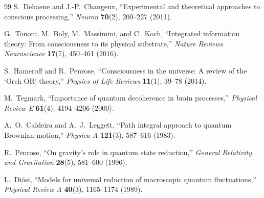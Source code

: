 \documentclass[11pt,a4paper]{article}
\begin{document}
\begin{thebibliography}{99}
S.~Dehaene and J.-P.~Changeux, ``Experimental and theoretical approaches to conscious processing,'' \emph{Neuron} \textbf{70}(2), 200--227 (2011).

G.~Tononi, M.~Boly, M.~Massimini, and C.~Koch, ``Integrated information theory: From consciousness to its physical substrate,'' \emph{Nature Reviews Neuroscience} \textbf{17}(7), 450--461 (2016).

S.~Hameroff and R.~Penrose, ``Consciousness in the universe: A review of the `Orch OR' theory,'' \emph{Physics of Life Reviews} \textbf{11}(1), 39--78 (2014).

M.~Tegmark, ``Importance of quantum decoherence in brain processes,'' \emph{Physical Review E} \textbf{61}(4), 4194--4206 (2000).

A.~O.~Caldeira and A.~J.~Leggett, ``Path integral approach to quantum Brownian motion,'' \emph{Physica A} \textbf{121}(3), 587--616 (1983).

R.~Penrose, ``On gravity's role in quantum state reduction,'' \emph{General Relativity and Gravitation} \textbf{28}(5), 581--600 (1996).

L.~Diósi, ``Models for universal reduction of macroscopic quantum fluctuations,'' \emph{Physical Review A} \textbf{40}(3), 1165--1174 (1989).

\end{thebibliography}
\end{document}
